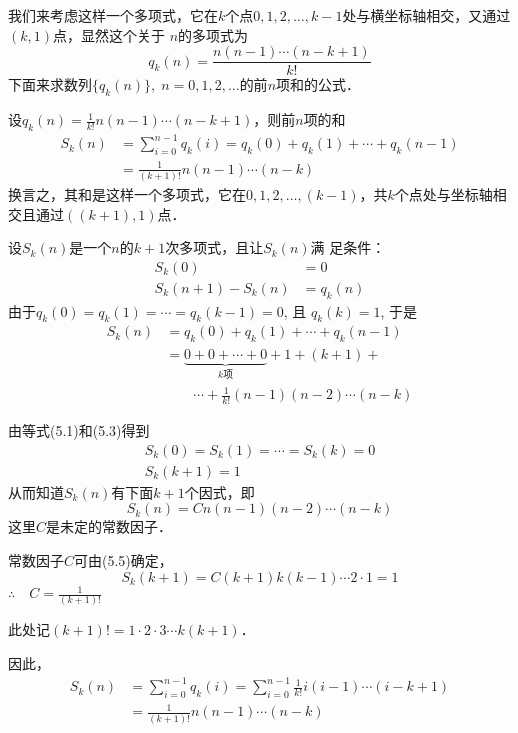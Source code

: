 我们来考虑这样一个多项式，它在$k$个点$0,1,2,\ldots,
k-1$处与横坐标轴相交，又通过$(k,1)$点，显然这个关于
$n$的多项式为
\[q_k(n)=\frac{n(n-1)\cdots(n-k+1)}{k!}\]
下面来求数列$\{q_k(n)\},\; n=0,1,2,\ldots$的前$n$项和的公式．

\begin{example}
设$q_k(n)=\frac{1}{k!}n(n-1)\cdots(n-k+1)$，则前$n$项的和
\[\begin{split}
    S_k(n)&=\sum^{n-1}_{i=0} q_k(i)=q_k(0)+q_k(1)+\cdots+q_k(n-1)\\
    &=\frac{1}{(k+1)!}n(n-1)\cdots(n-k)
\end{split}\]
换言之，其和是这样一个多项式，它在$0,1,2,\ldots,(k-1)$，共$k$个点处与坐标轴相交且通过$((k+1),1)$点．
\end{example}

\begin{solution}
设$S_k(n)$是一个$n$的$k+1$次多项式，且让$S_k(n)$满
足条件：
\begin{align}
    S_k(0)&=0\\
    S_k(n+1)-S_k(n)&=q_k(n)
\end{align}
由于$q_k(0)=q_k(1)=\cdots=q_k(k-1)=0$, 且
$q_k(k)=1$, 于是
\begin{equation}
    \begin{split}
 S_k(n)&=q_k(0)+q_k(1)+\cdots+q_k(n-1)\\
&=\underbrace{0+0+\cdots+0}_{\text{$k$项}}+1+(k+1)+\\
&\qquad \cdots+
\frac{1}{k!}(n-1)(n-2)\cdots(n-k)     
    \end{split}
\end{equation}

由等式(5.1)和(5.3)得到
\begin{align}
S_k(0)=S_k(1)=\cdots=S_k(k)=0\\
S_k(k+1)=1
\end{align}
从而知道$S_k(n)$有下面$k+1$个因式，即
\[S_k(n)=Cn(n-1)(n-2)\cdots(n-k)\]
这里$C$是未定的常数因子．

常数因子$C$可由(5.5)确定，
\[S_k(k+1)=C(k+1)k(k-1)\cdots2\cdot 1=1\]
$\therefore\quad C=\frac{1}{(k+1)!}$

此处记$(k+1)!=1\cdot 2\cdot 3\cdots k(k+1)$．

因此，
\[\begin{split}
    S_k(n)&=\sum^{n-1}_{i=0} q_k(i)=\sum^{n-1}_{i=0} \frac{1}{k!}i(i-1)\cdots (i-k+1)\\
    &=\frac{1}{(k+1)!}n(n-1)\cdots (n-k)
\end{split}\]
\end{solution}

